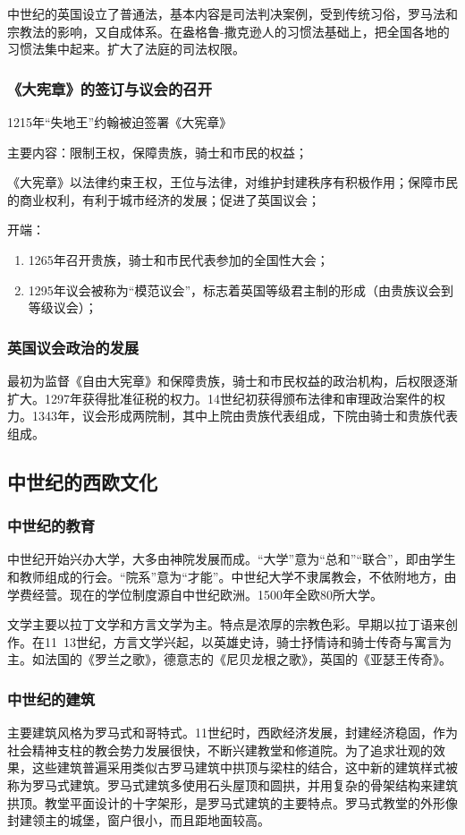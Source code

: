 中世纪的英国设立了普通法，基本内容是司法判决案例，受到传统习俗，罗马法和宗教法的影响，又自成体系。在盎格鲁-撒克逊人的习惯法基础上，把全国各地的习惯法集中起来。扩大了法庭的司法权限。

\subsubsection{《大宪章》的签订与议会的召开}
1215年“失地王”约翰被迫签署《大宪章》

主要内容：限制王权，保障贵族，骑士和市民的权益；

《大宪章》以法律约束王权，王位与法律，对维护封建秩序有积极作用；保障市民的商业权利，有利于城市经济的发展；促进了英国议会；

开端：
\begin{enumerate}
    \item 1265年召开贵族，骑士和市民代表参加的全国性大会；
    \item 1295年议会被称为“模范议会”，标志着英国等级君主制的形成（由贵族议会到等级议会）；
\end{enumerate}

\subsubsection{英国议会政治的发展}
最初为监督《自由大宪章》和保障贵族，骑士和市民权益的政治机构，后权限逐渐扩大。1297年获得批准征税的权力。14世纪初获得颁布法律和审理政治案件的权力。1343年，议会形成两院制，其中上院由贵族代表组成，下院由骑士和贵族代表组成。

\subsection{中世纪的西欧文化}

\subsubsection{中世纪的教育}
中世纪开始兴办大学，大多由神院发展而成。“大学”意为“总和”“联合”，即由学生和教师组成的行会。“院系”意为“才能”。中世纪大学不隶属教会，不依附地方，由学费经营。现在的学位制度源自中世纪欧洲。1500年全欧80所大学。

文学主要以拉丁文学和方言文学为主。特点是浓厚的宗教色彩。早期以拉丁语来创作。在11~13世纪，方言文学兴起，以英雄史诗，骑士抒情诗和骑士传奇与寓言为主。如法国的《罗兰之歌》，德意志的《尼贝龙根之歌》，英国的《亚瑟王传奇》。

\subsubsection{中世纪的建筑}
主要建筑风格为罗马式和哥特式。11世纪时，西欧经济发展，封建经济稳固，作为社会精神支柱的教会势力发展很快，不断兴建教堂和修道院。为了追求壮观的效果，这些建筑普遍采用类似古罗马建筑中拱顶与梁柱的结合，这中新的建筑样式被称为罗马式建筑。罗马式建筑多使用石头屋顶和圆拱，并用复杂的骨架结构来建筑拱顶。教堂平面设计的十字架形，是罗马式建筑的主要特点。罗马式教堂的外形像封建领主的城堡，窗户很小，而且距地面较高。

